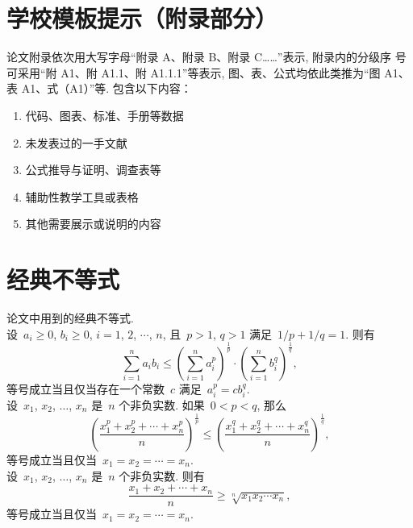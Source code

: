 \chapter{学校模板提示（附录部分）}

论文附录依次用大写字母“附录 A、附录 B、附录 C……”表示, 附录内的分级序
号可采用“附 A1、附 A1.1、附 A1.1.1”等表示, 图、表、公式均依此类推为“图 A1、
表 A1、式（A1）”等. 包含以下内容：

\begin{enumerate}
    \item 代码、图表、标准、手册等数据
    \item 未发表过的一手文献
    \item 公式推导与证明、调查表等
    \item 辅助性教学工具或表格
    \item 其他需要展示或说明的内容
\end{enumerate}

\chapter{经典不等式}
论文中用到的经典不等式.\\

设~$a_i\geq0$, $b_i\geq0$, $i=1$, $2$, $\cdots$, $n$, 且~$p>1$, $q>1$ 
满足~$1/p+1/q=1$. 则有
\[
\sum_{i=1}^{n}a_ib_i\leq\left(\sum_{i=1}^{n}a_i^p\right)^{\frac1p}
\cdot\left(\sum_{i=1}^{n}b_i^q\right)^{\frac1q},
\]
等号成立当且仅当存在一个常数~$c$ 满足~$a_i^p=cb_i^q$.\\

设~$x_1$, $x_2$, $\ldots$, $x_n$ 是~$n$ 个非负实数. 如果~$0<p<q$, 那么
\[
\left(\frac{x_1^p+x_2^p+\cdots+x_n^p}{n}\right)^{\frac{1}{p}}\leq
\left(\frac{x_1^q+x_2^q+\cdots+x_n^q}{n}\right)^{\frac{1}{q}},
\]
等号成立当且仅当~$x_1=x_2=\cdots =x_n$.\\

设~$x_1$, $x_2$, $\ldots$, $x_n$ 是~$n$ 个非负实数. 则有
\[
\frac{x_1+x_2+\cdots+x_n}{n}\geq\sqrt[n]{x_1x_2\cdots x_n},
\]
等号成立当且仅当~$x_1=x_2=\cdots =x_n$.